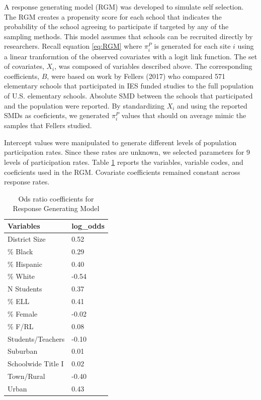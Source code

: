 \documentclass[man,floatsintext]{apa6}
\begin{document}
A response generating model (RGM) was developed to simulate self selection. The RGM creates a propensity score for each school that indicates the probability of the school agreeing to participate if targeted by any of the sampling methods. This model assumes that schools can be recruited directly by researchers. Recall equation \eqref{eq:RGM} where \(\pi^P_i\) is generated for each site \(i\) using a linear tranformtion of the observed covariates with a logit link function. The set of covariates, \(X_i\), was composed of variables described above. The corresponding coefficients, \(B\), were based on work by Fellers (2017) who compared 571 elementary schools that participated in IES funded studies to the full population of U.S. elementary schools. Absolute SMD between the schools that participated and the population were reported. By standardizing \(X_i\) and using the reported SMDs as coeficients, we generated \(\pi^P_i\) values that should on average mimic the samples that Fellers studied.

Intercept values were manipulated to generate different levels of population participation rates. Since these rates are unknown, we selected parameters for 9 levels of participation rates. Table \ref{tab:tab-RGM-Pars} reports the variables, variable codes, and coeficients used in the RGM. Covariate coefficients remained constant across response rates.

\begin{table}[tbp]
\begin{center}
\begin{threeparttable}
\caption{\label{tab:tab-RGM-Pars}Ods ratio coefficients for Response Generating Model}
\begin{tabular}{ll}
\toprule
Variables & \multicolumn{1}{c}{log\_odds}\\
\midrule
District Size & 0.52\\
\% Black & 0.29\\
\% Hispanic & 0.40\\
\% White & -0.54\\
N Students & 0.37\\
\% ELL & 0.41\\
\% Female & -0.02\\
\% F/RL & 0.08\\
Students/Teachers & -0.10\\
Suburban & 0.01\\
Schoolwide Title I & 0.02\\
Town/Rural & -0.40\\
Urban & 0.43\\
\bottomrule
\end{tabular}
\end{threeparttable}
\end{center}
\end{table}
\end{document}
